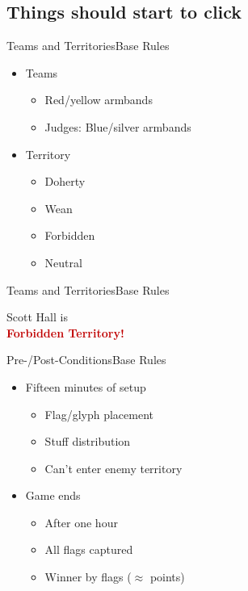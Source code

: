 \documentclass[17pt]{beamer}
\newcommand{\R}{\textcolor[HTML]{C00000}}
\newcommand{\flavortext}[1]{}
\begin{document}
\subsection{Things should start to click}

\begin{frame}{Teams and Territories}{Base Rules}
  \begin{itemize}
  \item Teams
    \begin{itemize}
    \item Red/yellow armbands
    \item Judges: Blue/silver armbands
    \end{itemize}
  \item Territory
    \begin{itemize}
    \item Doherty
    \item Wean
    \item Forbidden
    \item Neutral
    \end{itemize}
  \end{itemize}
\end{frame}

\begin{frame}{Teams and Territories}{Base Rules}
  \begin{center}
    \Huge{Scott Hall is\\\R{\textbf{Forbidden Territory!}}}
  \end{center}
\end{frame}

\begin{frame}{Pre-/Post-Conditions}{Base Rules}
  \begin{itemize}
  \item Fifteen minutes of setup
    \begin{itemize}
    \item Flag/glyph placement
    \item Stuff distribution
    \item Can't enter enemy territory
    \end{itemize}
  \item Game ends
    \begin{itemize}
    \item After one hour
    \item All flags captured
    \item Winner by flags ($\approx$ points)
    \end{itemize}
  \end{itemize}
\end{frame}
\end{document}
